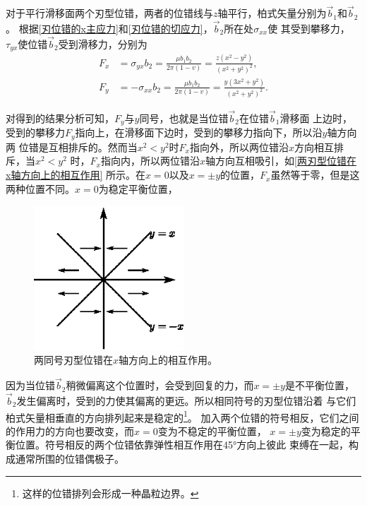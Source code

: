                     对于平行滑移面两个刃型位错，两者的位错线与$z$轴平行，柏式矢量分别为$\vec{b}_1$和$\vec{b}_2$。
                    根据\autoref{刃位错的x主应力}和\autoref{刃位错的切应力}，$\vec{b}_2$所在处$\sigma_{xx}$使
                    其受到攀移力，$\tau_{yx}$使位错$\vec{b}_2$受到滑移力，分别为
                    \begin{align}
                        F_x&=\sigma_{yx}b_2=\frac{\mu b_1b_2}{2\pi(1-v)}=\frac{z(x^2-y^2)}{(x^2+y^2)^2}\label{两个刃型位错之间的相互作用力},\\
                        F_y&=-\sigma_{xx}b_2=\frac{\mu b_1b_2}{2\pi(1-v)}=\frac{y(3x^2+y^2)}{(x^2+y^2)^2}.
                    \end{align}

                    对得到的结果分析可知，$F_y$与$y$同号，也就是当位错$\vec{b}_2$在位错$\vec{b}_1$滑移面
                    上边时，受到的攀移力$F_y$指向上，在滑移面下边时，受到的攀移力指向下，所以沿$y$轴方向两
                    位错是互相排斥的。然而当$x^2<y^2$时$F_x$指向外，所以两位错沿$x$方向相互排斥，当$x^2<y^2$
                    时，$F_x$指向内，所以两位错沿$x$轴方向互相吸引，如\autoref{两刃型位错在x轴方向上的相互作用}
                    所示。在$x=0$以及$x=\pm y$的位置，$F_x$虽然等于零，但是这两种位置不同。$x=0$为稳定平衡位置，
                    \begin{figure}[ht]
                        \centering
                        \includegraphics[width=0.5\textwidth]{fig/force_of_edge_dislocations_along_x_axis.eps}
                        \caption{两同号刃型位错在$x$轴方向上的相互作用。}
                        \label{两刃型位错在x轴方向上的相互作用}
                    \end{figure}
                    因为当位错$\vec{b}_2$稍微偏离这个位置时，会受到回复的力，而$x=\pm y$是不平衡位置，
                    $\vec{b}_2$发生偏离时，受到的力使其偏离的更远。所以相同符号的刃型位错沿着
                    与它们柏式矢量相垂直的方向排列起来是稳定的\footnote{这样的位错排列会形成一种晶粒边界。}。
                    加入两个位错的符号相反，它们之间的作用力的方向也要改变，而$x=0$变为不稳定的平衡位置，
                    $x=\pm y$变为稳定的平衡位置。符号相反的两个位错依靠弹性相互作用在\ang{45}方向上彼此
                    束缚在一起，构成通常所围的位错偶极子。


